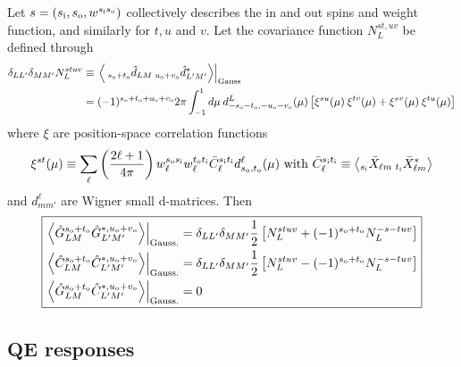\documentclass{article}
\newcommand{\si}[0]{{s_{\rm i}}}
\newcommand{\ti}[0]{{t_{\rm i}}}
\newcommand{\so}[0]{{s_{\rm o}}}
\renewcommand{\to}[0]{{t_{\rm o}}}
\newcommand{\uo}[0]{{u_{\rm o}}}
\newcommand{\vo}[0]{{v_{\rm o}}}
\newcommand{\av}[1]{\left\langle #1 \right\rangle}
\begin{document}
Let $s = (\si, \so, w^{\si\so})$ collectively describes the in and out spins and weight function, and similarly for $t, u$ and $v$. Let the covariance function $N^{st, uv}_L$ be defined through
\begin{equation}
\begin{split}
 \delta_{LL'}\delta_{MM'}N_L^{stuv} &\equiv \left.\av{\:_{\so + \to}\hat d_{LM}\: _{\uo + \vo}\hat d^*_{L'M'}} \right|_{\rm Gauss}\\ &= (-1)^{\so + \to + \uo + \vo}2\pi  \int_{-1}^1 d \mu\:  d^L_{-\so - \to, -\uo - \vo}(\mu) \left[\xi^{su}(\mu)\:\xi^{tv}(\mu)  + \xi^{sv}(\mu)\:\xi^{tu}(\mu) \right]
\end{split}
\end{equation}
where $\xi$ are position-space correlation functions
\begin{equation}
\xi^{st}(\mu) \equiv  \sum_\ell \left(\frac{2\ell + 1}{4\pi}\right)w^{\so\si}_\ell w^{\to\ti}_\ell \bar C_\ell^{\si \ti} d^\ell_{\so,\to}(\mu)\textrm{ with } \bar C_\ell^{\si \ti} \equiv \av{ _{\si}\bar X_{\ell m}\: _{\ti} \bar X^*_{\ell m} }
\end{equation}
and $d^\ell_{mm'}$ are Wigner small d-matrices.
Then
\begin{equation} \boxed{
\begin{split}
\left.\av{\hat G^{\so + \to}_{LM} \hat G^{*, \uo + \vo}_{L' M'} }\right|_{\rm Gauss.} &=\delta_{LL'}\delta_{MM'} \frac 12\left[N_L^{stuv} +  (-1)^{\so + \to} N^{-s-tuv}_L\right] \\
		\left.\av{\hat C^{\so + \to}_{LM} \hat C^{*, \uo + \vo}_{L' M'} }\right|_{\rm Gauss.} &= \delta_{LL'}\delta_{MM'}\frac 12\left[N_L^{stuv} -  (-1)^{\so + \to} N^{-s-tuv}_L\right]\\
	\left.\av{\hat G^{\so + \to}_{LM} \hat C^{*, \uo + \vo}_{L' M'} }\right|_{\rm Gauss.} &=0
\end{split}}
\end{equation}
\subsection{QE responses}
\end{document}
